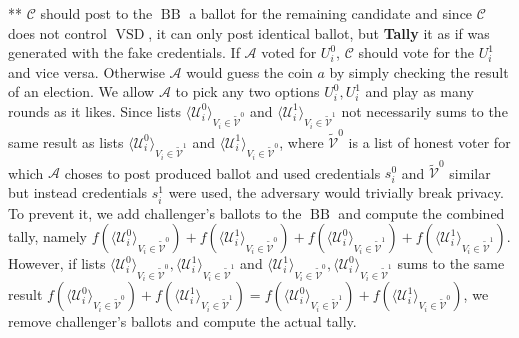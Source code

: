 \documentclass[12pt]{article}
\DeclareMathOperator{\vsd}{VSD}
\DeclareMathOperator{\bb}{BB}
\begin{document}
** $\mathcal{C}$ should post to the $\bb$ a ballot for the remaining candidate and since $\mathcal{C}$ does not control $\vsd$, it can only post identical ballot, but \textbf{Tally} it as if was generated with  the fake credentials. If  $\mathcal{A}$  voted for $U_i^0$, $\mathcal{C}$ should vote for the $U_i^1$ and vice versa. Otherwise  $\mathcal{A}$  would guess the coin $a$ by simply checking the result of an election. We allow $\mathcal{A}$ to pick any two options $U_i^0,U_i^1$  and play as many rounds as it likes. Since lists $\langle \mathcal{U}^0_i \rangle _{V_i \in \tilde{\mathcal{V}}^0} $ and  $\langle \mathcal{U}^1_i \rangle _{V_i \in \tilde{\mathcal{V}}^1} $  not necessarily  sums to  the same result as lists  $\langle \mathcal{U}^0_i \rangle _{V_i \in \tilde{\mathcal{V}}^1} $ and  $\langle \mathcal{U}^1_i \rangle _{V_i \in \tilde{\mathcal{V}}^0} $, where $ \tilde{\mathcal{V}}^0$ is a list of honest voter for which $\mathcal{A}$ choses to post produced ballot and used credentials $s_i^0$ and $ \tilde{\mathcal{V}}^0$ similar but instead credentials $s_i^1$ were used, the adversary would trivially break privacy. To prevent it, we add challenger's ballots to the $\bb$ and compute the combined tally, namely $f(\langle \mathcal{U}^0_i \rangle _{V_i \in \tilde{\mathcal{V}}^0} ) + f(\langle \mathcal{U}^1_i \rangle _{V_i \in \tilde{\mathcal{V}}^0} )+ f(\langle \mathcal{U}^0_i \rangle _{V_i \in \tilde{\mathcal{V}}^1} ) +  f(\langle \mathcal{U}^1_i \rangle _{V_i \in \tilde{\mathcal{V}}^1} )$. However, if lists $\langle \mathcal{U}^0_i \rangle _{V_i \in \tilde{\mathcal{V}}^0}, \langle \mathcal{U}^1_i \rangle _{V_i \in \tilde{\mathcal{V}}^1}$ and $\langle \mathcal{U}^1_i \rangle _{V_i \in \tilde{\mathcal{V}}^0}, \langle \mathcal{U}^0_i \rangle _{V_i \in \tilde{\mathcal{V}}^1}$ sums to the same result $f(\langle \mathcal{U}^0_i \rangle _{V_i \in \tilde{\mathcal{V}}^0} ) + f(\langle \mathcal{U}^1_i \rangle _{V_i \in \tilde{\mathcal{V}}^1} ) =  f(\langle \mathcal{U}^0_i \rangle _{V_i \in \tilde{\mathcal{V}}^1} ) +  f(\langle \mathcal{U}^1_i \rangle _{V_i \in \tilde{\mathcal{V}}^0} )$, we remove challenger's ballots and compute the actual tally. \\\\
\end{document}
